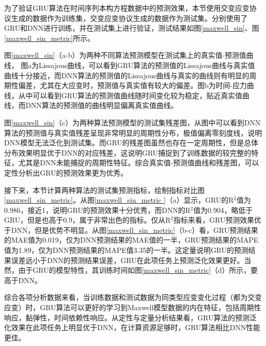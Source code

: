 为了验证GRU算法在时间序列本构方程数据中的预测效果，本节使用交变应变协议生成的数据作为训练集，交变应变协议生成的数据作为测试集。分别使用了GRU和DNN进行训练，并在测试集上进行验证，测试结果如图\ref{maxwell_sin}、图\ref{maxwell_sin_metric}所示。

图\ref{maxwell_sin}（a-b）为两种不同算法预测模型在测试集上的真实值-预测值曲线，
图a为Lissajous曲线，可以看到GRU算法的预测值的Lissajous曲线与真实值曲线十分接近，而DNN算法的预测值的Lissajous曲线与真实的曲线则有明显的周期性偏差，尤其在大应变时，预测值与真实值有较大的偏差。图b为时间-应力曲线，从中可以看到GRU算法的预测值曲线随时间变化较为稳定，贴近真实值曲线，而DNN算法的预测值的曲线明显偏离真实值曲线。

图\ref{maxwell_sin}（c）为两种算法预测模型的测试集残差图，从图中可以看到DNN算法的预测值与真实值残差呈现非常明显的周期性分布，极值偏离零刻度线，说明DNN模型无法泛化到测试集。而GRU的残差图虽然也存在一定周期性，但是总体分布效果明显优于DNN的对应残差，这说明GRU捕捉到了训练数据的较完整的特征，尤其是DNN未能捕捉的周期性特征。综合真实值-预测值曲线和残差图，可以定性分析出GRU的预测效果更为优秀。


接下来，本节计算两种算法的测试集预测指标，绘制指标对比图\ref{maxwell_sin_metric}。从图\ref{maxwell_sin_metric
}（a）显示，GRU的R$^2$值为0.986，接近1，说明GRU的预测效果十分优秀，而DNN的R$^2$值为0.904，略低于GRU，但是也高于0.9，属于非常出色的指标。仅从R$^2$指标来看，GRU预测效果优于DNN，但是优势不明显。从图\ref{maxwell_sin_metric}（b-c）看，GRU预测结果的MAE值为0.019，仅为DNN预测结果的MAE值的一半，GRU预测结果的MAPE值为1.89，仅为DNN预测结果的MAPE值3.35的一半。这定量说明GRU的预测结果误差远小于DNN的预测结果误差，GRU在此项任务上预测泛化效果更好。当然，由于GRU的模型特性，其训练时间如图\ref{maxwell_sin_metric}（d）所示，要高于DNN。

综合各项分析数据来看，当训练数据和测试数据为同类型应变变化过程（都为交变应变）时，GRU算法可以更好的学习到Maxwell模型数据的内在特征，包括周期性响应，黏弹性，时间依赖性响应。从定性与定量分析结果看，GRU算法的预测泛化效果在此项任务上明显优于DNN，在计算资源足够时，GRU算法相比DNN性能更佳。


